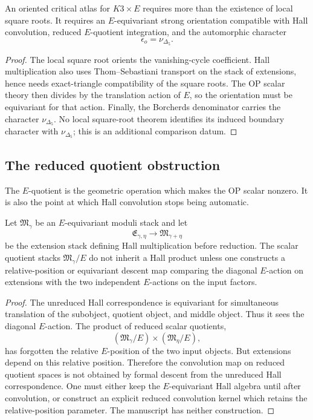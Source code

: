 \begin{proposition}
\label{prop:orientation-needed-for-igusa}
An oriented critical atlas for \(K3\times E\) requires more than the
existence of local square roots.  It requires an \(E\)-equivariant strong
orientation compatible with Hall convolution, reduced \(E\)-quotient
integration, and the automorphic character
\[
  \epsilon_o=\nu_{\Delta_5}.
\]
\end{proposition}

\begin{proof}
The local square root orients the vanishing-cycle coefficient.  Hall
multiplication also uses Thom--Sebastiani transport on the stack of
extensions, hence needs exact-triangle compatibility of the square
roots.  The OP scalar theory then divides by the translation action of
\(E\), so the orientation must be equivariant for that action.  Finally,
the Borcherds denominator carries the character \(\nu_{\Delta_5}\).  No
local square-root theorem identifies its induced boundary character with
\(\nu_{\Delta_5}\); this is an additional comparison datum.
\end{proof}

\subsection{The reduced quotient obstruction}

The \(E\)-quotient is the geometric operation which makes the OP scalar
nonzero.  It is also the point at which Hall convolution stops being
automatic.

\begin{proposition}
\label{prop:reduced-quotient-not-hall}
Let \(\mathfrak M_\gamma\) be an \(E\)-equivariant moduli stack and let
\[
  \mathfrak E_{\gamma,\eta}
  \longrightarrow
  \mathfrak M_{\gamma+\eta}
\]
be the extension stack defining Hall multiplication before reduction.
The scalar quotient stacks \(\mathfrak M_\gamma/E\) do not inherit a
Hall product unless one constructs a relative-position or equivariant
descent map comparing the diagonal \(E\)-action on extensions with the
two independent \(E\)-actions on the input factors.
\end{proposition}

\begin{proof}
The unreduced Hall correspondence is equivariant for simultaneous
translation of the subobject, quotient object, and middle object.  Thus
it sees the diagonal \(E\)-action.  The product of reduced scalar
quotients,
\[
  (\mathfrak M_\gamma/E)\times(\mathfrak M_\eta/E),
\]
has forgotten the relative \(E\)-position of the two input objects.  But
extensions depend on this relative position.  Therefore the convolution
map on reduced quotient spaces is not obtained by formal descent from
the unreduced Hall correspondence.  One must either keep the
\(E\)-equivariant Hall algebra until after convolution, or construct an
explicit reduced convolution kernel which retains the relative-position
parameter.  The manuscript has neither construction.
\end{proof}

